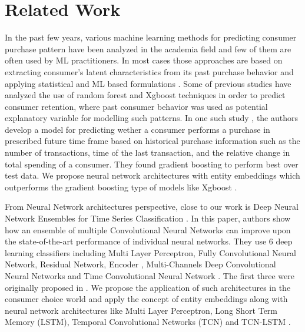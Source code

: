 \section{Related Work}
\label{sec:relatedwork}
In the past few years, various machine learning methods for predicting consumer purchase pattern have been analyzed in
the academia field and few of them are often used by ML practitioners. In most cases those approaches are based on extracting 
consumer's latent characteristics from its past purchase behavior and applying statistical and  
ML based formulations \cite{fader2009probability, choudhury2019machine}. 
Some of previous studies have analyzed the use of random forest and Xgboost techniques in order to predict 
consumer retention, where past consumer behavior was used as potential explanatory variable 
for modelling such patterns. In one such study \cite{martinez2020machine}, the authors develop a model for predicting wether a 
consumer performs a purchase in prescribed future time frame based on historical purchase information such as the number
of transactions, time of the last transaction, and the relative change in total spending of a consumer. 
They found gradient boosting to perform best over test data. We propose neural network architectures with entity embeddings
\cite{guo2016entity} which outperforms the gradient boosting type of models like Xgboost \cite{chen2016xgboost}. 

From Neural Network architectures perspective,
close to our work is Deep Neural Network Ensembles for Time Series Classification \cite{fawaz2019deep}. 
In this paper, authors show how an ensemble of multiple Convolutional Neural Networks can improve upon the 
state-of-the-art performance of individual neural networks. They use 6 deep learning classifiers 
including Multi Layer Perceptron, Fully Convolutional Neural Network, Residual Network, 
Encoder \cite{serra2018towards}, Multi-Channels Deep Convolutional Neural Networks \cite{zheng2014time} and 
Time Convolutional Neural Network \cite{zhao2017convolutional}. The first three were originally proposed in \cite{wang2017time}.
We propose the application of such architectures in the consumer choice world and apply the concept of entity embeddings 
\cite{guo2016entity} along with neural network architectures
like Multi Layer Perceptron, Long Short Term Memory (LSTM), Temporal Convolutional Networks (TCN) \cite{lea2016temporal} and 
TCN-LSTM \cite{karim2017lstm}.

